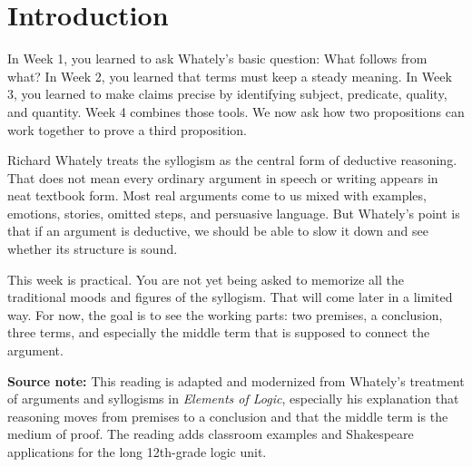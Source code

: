 \documentclass[12pt]{article}
\newcommand{\focusbox}[1]{\par\vspace{0.4em}\noindent\begingroup\setlength{\fboxsep}{6pt}\colorbox{gray!12}{\begin{minipage}{\dimexpr\linewidth-2\fboxsep\relax}#1\end{minipage}}\endgroup\par\vspace{0.5em}}
\begin{document}
\section*{Introduction}
In Week 1, you learned to ask Whately's basic question: What follows from what? In Week 2, you learned that terms must keep a steady meaning. In Week 3, you learned to make claims precise by identifying subject, predicate, quality, and quantity. Week 4 combines those tools. We now ask how two propositions can work together to prove a third proposition.

Richard Whately treats the syllogism as the central form of deductive reasoning. That does not mean every ordinary argument in speech or writing appears in neat textbook form. Most real arguments come to us mixed with examples, emotions, stories, omitted steps, and persuasive language. But Whately's point is that if an argument is deductive, we should be able to slow it down and see whether its structure is sound.

This week is practical. You are not yet being asked to memorize all the traditional moods and figures of the syllogism. That will come later in a limited way. For now, the goal is to see the working parts: two premises, a conclusion, three terms, and especially the middle term that is supposed to connect the argument.

\focusbox{\textbf{Source note:} This reading is adapted and modernized from Whately's treatment of arguments and syllogisms in \textit{Elements of Logic}, especially his explanation that reasoning moves from premises to a conclusion and that the middle term is the medium of proof. The reading adds classroom examples and Shakespeare applications for the long 12th-grade logic unit.}
\end{document}
